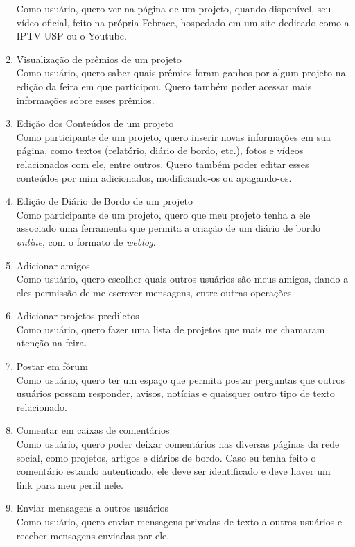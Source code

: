 \begin{enumerate}
        Como usuário, quero ver na página de um projeto, quando disponível, seu vídeo oficial, feito na própria Febrace, hospedado em um site dedicado como a IPTV-USP ou o Youtube.
      \item Visualização de prêmios de um projeto \\
        Como usuário, quero saber quais prêmios foram ganhos por algum projeto na edição da feira em que participou. Quero também poder acessar mais informações sobre esses prêmios.
      \item Edição dos Conteúdos de um projeto \\
        Como participante de um projeto, quero inserir novas informações em sua página, como textos (relatório, diário de bordo, etc.), fotos e vídeos relacionados com ele, entre outros. Quero também poder editar esses conteúdos por mim adicionados, modificando-os ou apagando-os.
      \item Edição de Diário de Bordo de um projeto \\
        Como participante de um projeto, quero que meu projeto tenha a ele associado uma ferramenta que permita a criação de um diário de bordo \textit{online}, com o formato de \textit{weblog}.
      \item Adicionar amigos \\
        Como usuário, quero escolher quais outros usuários são meus amigos, dando a eles permissão de me escrever mensagens, entre outras operações.
      \item Adicionar projetos prediletos \\
        Como usuário, quero fazer uma lista de projetos que mais me chamaram atenção na feira. 
      \item Postar em fórum \\
        Como usuário, quero ter um espaço que permita postar perguntas que outros usuários possam responder, avisos, notícias e quaisquer outro tipo de texto relacionado.
      \item Comentar em caixas de comentários \\
        Como usuário, quero poder deixar comentários nas diversas páginas da rede social, como projetos, artigos e diários de bordo. Caso eu tenha feito o comentário estando autenticado, ele deve ser identificado e deve haver um link para meu perfil nele. 
      \item Enviar mensagens a outros usuários \\
        Como usuário, quero enviar mensagens privadas de texto a outros usuários e receber mensagens enviadas por ele. 

\end{enumerate}
